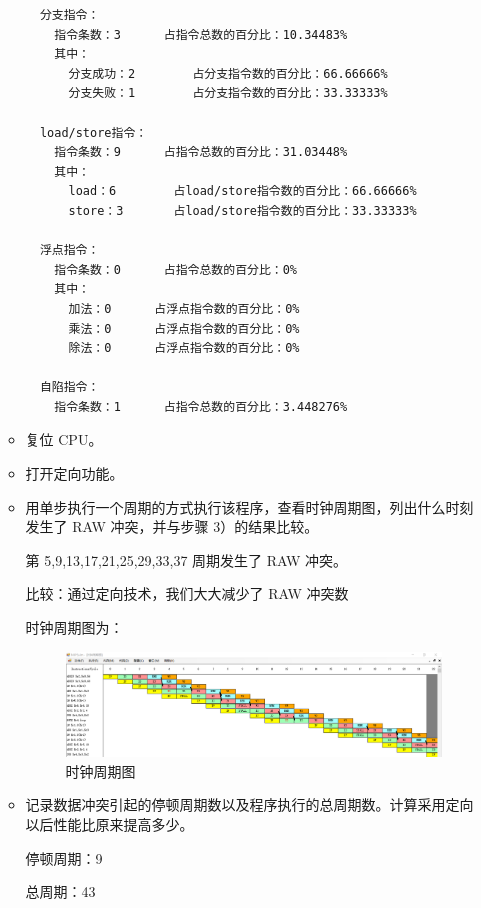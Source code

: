 \documentclass[blue,normal,cn]{elegantnote}
\begin{document}
\begin{enumerate}[wide=0pt, listparindent=2em, parsep=0pt]
\begin{itemize}[leftmargin=3em, listparindent=2em, parsep=0pt]
\begin{lstlisting}
  分支指令：
    指令条数：3		占指令总数的百分比：10.34483%
    其中：
      分支成功：2		占分支指令数的百分比：66.66666%
      分支失败：1		占分支指令数的百分比：33.33333%

  load/store指令：
    指令条数：9		占指令总数的百分比：31.03448%
    其中：
      load：6		占load/store指令数的百分比：66.66666%
      store：3		占load/store指令数的百分比：33.33333%

  浮点指令：
    指令条数：0		占指令总数的百分比：0%
    其中：
      加法：0		占浮点指令数的百分比：0%
      乘法：0		占浮点指令数的百分比：0%
      除法：0		占浮点指令数的百分比：0%

  自陷指令：
    指令条数：1		占指令总数的百分比：3.448276%
\end{lstlisting}
              \item 复位 CPU。
              \item 打开定向功能。
              \item 用单步执行一个周期的方式执行该程序，查看时钟周期图，列出什么时刻发生了 RAW 冲突，并与步骤 3）的结果比较。

                    \textcolor{ans}{第 5,9,13,17,21,25,29,33,37 周期发生了 RAW 冲突。}

                    \textcolor{ans}{比较：通过定向技术，我们大大减少了 RAW 冲突数}

                    \textcolor{ans}{时钟周期图为：}

                    \begin{figure}[H]
                        \centering
                        \includegraphics[width=1\textwidth]{fig/bypass.png}
                        \caption{时钟周期图}
                        \label{fig:bypass}
                    \end{figure}

              \item 记录数据冲突引起的停顿周期数以及程序执行的总周期数。计算采用定向以后性能比原来提高多少。

                    \textcolor{ans} {停顿周期：9}

                    \textcolor{ans} {总周期：43}


\end{itemize}
\end{enumerate}
\end{document}
